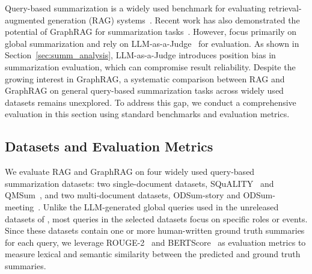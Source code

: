Query-based summarization is a widely used benchmark for evaluating retrieval-augmented generation (RAG) systems~\cite{ram2023context, yu2023augmentation}. Recent work has also demonstrated the potential of GraphRAG for summarization tasks~\cite{edge2024local}. However, \citet{edge2024local} focus primarily on global summarization and rely on LLM-as-a-Judge~\cite{zheng2023judging} for evaluation. As shown in Section~\ref{sec:summ_analysis}, LLM-as-a-Judge introduces position bias in summarization evaluation, which can compromise result reliability. Despite the growing interest in GraphRAG, a systematic comparison between RAG and GraphRAG on general query-based summarization tasks across widely used datasets remains unexplored. To address this gap, we conduct a comprehensive evaluation in this section using standard benchmarks and evaluation metrics.


\subsection{Datasets and Evaluation Metrics}
We evaluate RAG and GraphRAG on four widely used query-based summarization datasets: two single-document datasets, SQuALITY~\cite{wang2022squality} and QMSum~\cite{zhong2021qmsum}, and two multi-document datasets, ODSum-story and ODSum-meeting~\cite{zhou2023odsum}.
Unlike the LLM-generated global queries used in the unreleased datasets of \citet{edge2024local}, most queries in the selected datasets focus on specific roles or events. Since these datasets contain one or more human-written ground truth summaries for each query, we leverage ROUGE-2~\cite{lin2004rouge} and BERTScore~\cite{zhang2019bertscore} as evaluation metrics to measure lexical and semantic similarity between the predicted and ground truth summaries.


